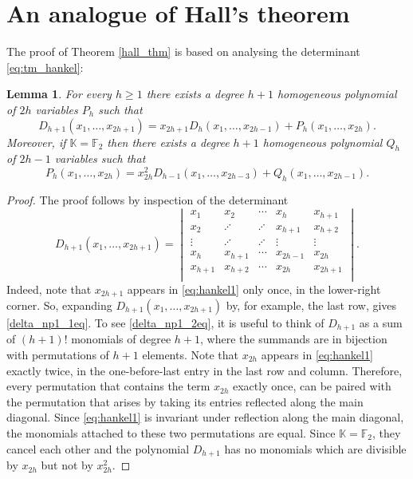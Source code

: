 \documentclass[a4paper,12pt]{article}
\newtheorem{lem}[thm]{Lemma}
\def\bbf{\mathbb{F}}
\def\fq{\bbk}
\def\bbk{\mathbb{K}}
\newcommand{\HankelPolynomial}{D}
\begin{document}
\section{An analogue of Hall's theorem}

The proof of Theorem \ref{hall_thm} is based on analysing the determinant \eqref{eq:tm_hankel}:

\begin{lem}\label{lem:inspection}
    For every $h\geq1$ there exists a degree $h+1$ homogeneous polynomial of $2h$ variables $P_h$ such that
    \begin{equation}\label{delta_np1_1eq}
        \HankelPolynomial_{h+1}(x_1,\ldots,x_{2h+1})=x_{2h+1}\HankelPolynomial_h(x_1,\ldots,x_{2h-1})+P_h(x_1,\ldots,x_{2h}).
    \end{equation}
    Moreover, if $\fq=\bbf_2$ then there exists a degree $h+1$ homogeneous polynomial $Q_h$ of $2h-1$ variables such that
    \begin{equation}\label{delta_np1_2eq}
        P_{h}(x_1,\ldots,x_{2h})=x_{2h}^2\HankelPolynomial_{h-1}(x_1,\ldots,x_{2h-3})+Q_h(x_1,\ldots,x_{2h-1}).
    \end{equation}
\end{lem}
\begin{proof}
    The proof follows by inspection of the determinant
    \begin{equation}\label{eq:hankel1}
    	\HankelPolynomial_{h+1}(x_1,\ldots,x_{2h+1}) = 
    	\begin{vmatrix}
    		x_{1}&x_{2}&\cdots &x_{h}&x_{h+1}\\
    		x_{2}&\iddots&\iddots&x_{h+1}&x_{h+2}\\
    		\vdots&\iddots&\iddots&\vdots&\vdots\\
    		x_{h}&x_{h+1}&\cdots&x_{2h-1}&x_{2h}\\
            x_{h+1}&x_{h+2}&\cdots&x_{2h}&x_{2h+1}\\
    	\end{vmatrix}.
    \end{equation}
Indeed, note that $x_{2h+1}$ appears in \eqref{eq:hankel1} only once, in the lower-right corner. So, expanding $\HankelPolynomial_{h+1}(x_1,\ldots,x_{2h+1})$ by, for example, the last row, gives \eqref{delta_np1_1eq}. To see \eqref{delta_np1_2eq}, it is useful to think of $\HankelPolynomial_{h+1}$ as a sum of $(h+1)!$ monomials of degree $h+1$, where the summands are in bijection with permutations of $h+1$ elements. Note that $x_{2h}$ appears in \eqref{eq:hankel1} exactly twice, in the one-before-last entry in the last row and column. Therefore, every permutation that contains the term $x_{2h}$ exactly once, can be paired with the permutation that arises by taking its entries reflected along the main diagonal. Since \eqref{eq:hankel1} is invariant under reflection along the main diagonal, the monomials attached to these two permutations are equal. Since $\fq=\bbf_2$, they cancel each other and the polynomial $\HankelPolynomial_{h+1}$ has no monomials which are divisible by $x_{2h}$ but not by $x_{2h}^2$.
\end{proof}
\end{document}
